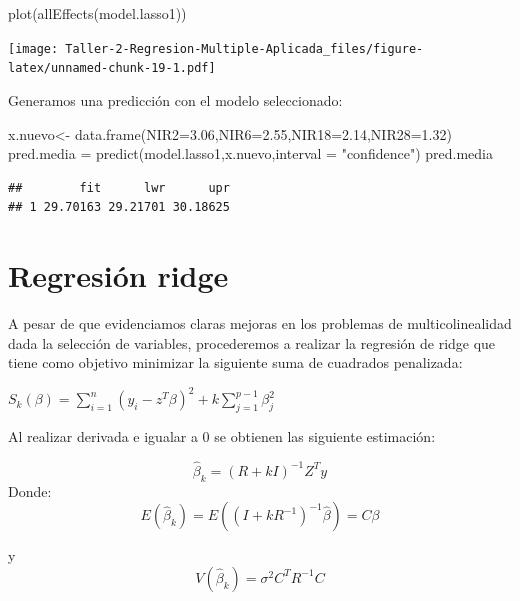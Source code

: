 \documentclass[
]{article}
\newenvironment{Shaded}{\begin{snugshade}}{\end{snugshade}}
\newcommand{\AttributeTok}[1]{\textcolor[rgb]{0.77,0.63,0.00}{#1}}
\newcommand{\FloatTok}[1]{\textcolor[rgb]{0.00,0.00,0.81}{#1}}
\newcommand{\FunctionTok}[1]{\textcolor[rgb]{0.00,0.00,0.00}{#1}}
\newcommand{\NormalTok}[1]{#1}
\newcommand{\OtherTok}[1]{\textcolor[rgb]{0.56,0.35,0.01}{#1}}
\newcommand{\StringTok}[1]{\textcolor[rgb]{0.31,0.60,0.02}{#1}}
\begin{document}
\begin{Shaded}
\begin{Highlighting}[]
\FunctionTok{plot}\NormalTok{(}\FunctionTok{allEffects}\NormalTok{(model.lasso1))}
\end{Highlighting}
\end{Shaded}

\texttt{[image: Taller-2-Regresion-Multiple-Aplicada\_files/figure-latex/unnamed-chunk-19-1.pdf]}

Generamos una predicción con el modelo seleccionado:

\begin{Shaded}
\begin{Highlighting}[]
\NormalTok{x.nuevo}\OtherTok{\textless{}{-}} \FunctionTok{data.frame}\NormalTok{(}\AttributeTok{NIR2=}\FloatTok{3.06}\NormalTok{,}\AttributeTok{NIR6=}\FloatTok{2.55}\NormalTok{,}\AttributeTok{NIR18=}\FloatTok{2.14}\NormalTok{,}\AttributeTok{NIR28=}\FloatTok{1.32}\NormalTok{)}
\NormalTok{pred.media }\OtherTok{=} \FunctionTok{predict}\NormalTok{(model.lasso1,x.nuevo,}\AttributeTok{interval =} \StringTok{"confidence"}\NormalTok{)}
\NormalTok{pred.media}
\end{Highlighting}
\end{Shaded}

\begin{verbatim}
##        fit      lwr      upr
## 1 29.70163 29.21701 30.18625
\end{verbatim}

\hypertarget{regresiuxf3n-ridge}{%
\section{Regresión ridge}\label{regresiuxf3n-ridge}}

A pesar de que evidenciamos claras mejoras en los problemas de
multicolinealidad dada la selección de variables, procederemos a
realizar la regresión de ridge que tiene como objetivo minimizar la
siguiente suma de cuadrados penalizada:

\begin{center}
$S_{k}(\beta)=\sum_{i=1}^{n}({y_{i}-z^
T}\beta)^2+k\sum_{j=1}^{p-1}\beta^2_{j}$
\end{center}

Al realizar derivada e igualar a 0 se obtienen las siguiente estimación:

\[\hat{\beta}_{k}= (R+kI)^{-1}Z^Ty\] Donde:
\[E(\hat{\beta}_{k})=E((I+kR^{-1})^{-1}\hat{\beta})=C\beta\]

y \[V(\hat{\beta}_{k})=\sigma^2C^{T}R^{-1}C\]
\end{document}
